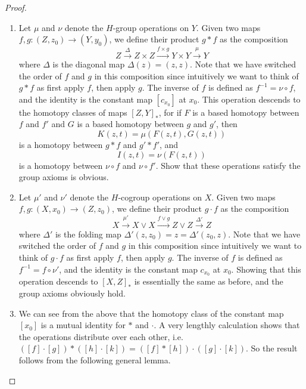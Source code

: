 \begin{proof}
\sloppyspace
\begin{enumerate}

	\item Let $\mu$ and $\nu$ denote the $H$-group operations on $Y$. Given two maps $f,g : (Z,z_0) \rightarrow (Y,y_0)$, we define their product $g * f$ as the composition
	\[ Z \stackrel{\Delta}{\longrightarrow} Z \times Z \stackrel{f \times g}{\longrightarrow} Y \times Y \stackrel{\mu}{\longrightarrow} Y \]
	where $\Delta$ is the diagonal map $\Delta(z) = (z,z)$. Note that we have switched the order of $f$ and $g$ in this composition since intuitively we want to think of $g * f$ as first apply $f$, then apply $g$. The inverse of $f$ is defined as $f^{-1} = \nu \circ f$, and the identity is the constant map $[c_{x_0}]$ at $x_0$. This operation descends to the homotopy classes of maps $[Z,Y]_*$, for if $F$ is a based homotopy between $f$ and $f'$ and $G$ is a based homotopy between $g$ and $g'$, then
	\[ K(z,t) = \mu(F(z,t),G(z,t)) \]
	is a homotopy between $g * f$ and $g' * f'$, and
	\[ I(z,t) = \nu(F(z,t)) \]
	is a homotopy between $\nu \circ f$ and $\nu \circ f'$. Show that these operations satisfy the group axioms is obvious.
	
	\item Let $\mu'$ and $\nu'$ denote the $H$-cogroup operations on $X$. Given two maps $f,g : (X,x_0) \rightarrow (Z,z_0)$, we define their product $g \cdot f$ as the composition
	\[ X \stackrel{\mu'}{\longrightarrow} X \vee X \stackrel{f \vee g}{\longrightarrow} Z \vee Z \stackrel{\Delta'}{\longrightarrow} Z \]
	where $\Delta'$ is the folding map $\Delta'(z,z_0)=z=\Delta'(z_0,z)$. Note that we have switched the order of $f$ and $g$ in this composition since intuitively we want to think of $g \cdot f$ as first apply $f$, then apply $g$. The inverse of $f$ is defined as $f^{-1} = f \circ \nu'$, and the identity is the constant map $c_{x_0}$ at $x_0$. Showing that this operation descends to $[X,Z]_*$ is essentially the same as before, and the group axioms obviously hold.
	
	\item We can see from the above that the homotopy class of the constant map $[x_0]$ is a mutual identity for $*$ and $\cdot$. A very lengthly calculation shows that the operations distribute over each other, i.e. $([f] \cdot [g]) * ([h] \cdot [k]) = ([f] * [h]) \cdot ([g] \cdot [k])$. So the result follows from the following general lemma.
	
\end{enumerate}
\end{proof}

